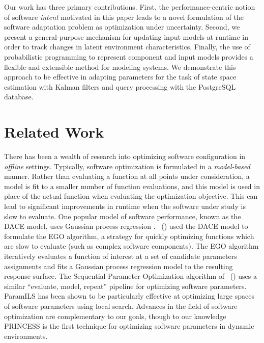 \documentclass[letterpaper]{article}
\begin{document}
Our work has three primary contributions. First, the performance-centric notion of software \emph{intent} motivated in this paper leads to a novel formulation of the software adaptation problem as optimization under uncertainty.
Second, we present a general-purpose mechanism for updating input models at runtime in order to track changes in latent environment characteristics.
Finally, the use of probabilistic programming to represent component and input models provides a flexible and extensible method for modeling systems.
We demonstrate this approach to be effective in adapting parameters for the task of state space estimation with Kalman filters and query processing with the PostgreSQL database.

\section{Related Work}

There has been a wealth of research into optimizing software configuration in \emph{offline} settings.
Typically, software optimization is formulated in a \emph{model-based} manner.
Rather than evaluating a function at all points under consideration, a model is fit to a smaller number of function evaluations, and this model is used in place of the actual function when evaluating the optimization objective.
This can lead to significant improvements in runtime when the software under study is slow to evaluate.
One popular model of software performance, known as the DACE model, uses Gaussian process regression \cite{sacks1989design}.
\citeauthor{jones1998efficient}~(\citeyear{jones1998efficient}) used the DACE model to formulate the EGO algorithm, a strategy for quickly optimizing functions which are slow to evaluate (such as complex software components).
The EGO algorithm iteratively evaluates a function of interest at a set of candidate parameters assignments and fits a Gaussian process regression model to the resulting response surface.
The Sequential Parameter Optimization algorithm of \citeauthor{bartz2005sequential}~(\citeyear{bartz2005sequential}) uses a similar ``evaluate, model, repeat'' pipeline for optimizing software parameters.
ParamILS \cite{hutter2009paramils} has been shown to be particularly effective at optimizing large spaces of software parameters using local search.
Advances in the field of software optimization are complementary to our goals, though to our knowledge PRINCESS is the first technique for optimizing software parameters in dynamic environments.
\end{document}
